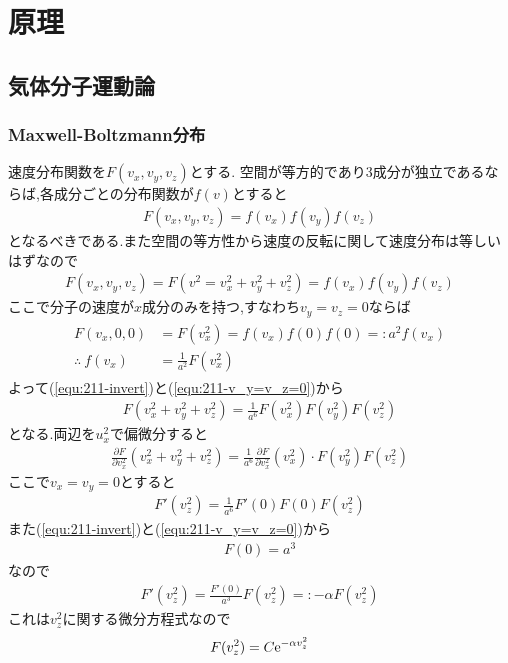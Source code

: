 \section{原理}
\subsection{気体分子運動論}
\subsubsection{Maxwell-Boltzmann分布}
速度分布関数を$F(v_x,v_y,v_z)$とする.
空間が等方的であり3成分が独立であるならば,各成分ごとの分布関数が$f(v)$とすると
\begin{align}
  F(v_x,v_y,v_z)=f(v_x)f(v_y)f(v_z)
\end{align}
となるべきである.また空間の等方性から速度の反転に関して速度分布は等しいはずなので
\begin{align}
  \label{equ:211-invert}
  F(v_x,v_y,v_z)=F(v^2=v_x^2+v_y^2+v_z^2)=f(v_x)f(v_y)f(v_z)
\end{align}
ここで分子の速度が$x$成分のみを持つ,すなわち$v_y=v_z=0$ならば
\begin{align}
  \label{equ:211-v_y=v_z=0}
  \begin{split}
    F(v_x,0,0)&=F(v_x^2)=f(v_x)f(0)f(0)=:a^2f(v_x)\\
    \therefore\ f(v_x)&=\frac{1}{a^2}F(v_x^2)
  \end{split}
\end{align}
よって(\ref{equ:211-invert})と(\ref{equ:211-v_y=v_z=0})から
\begin{align}
  F(v_x^2+v_y^2+v_z^2)=\frac{1}{a^6}F(v_x^2)F(v_y^2)F(v_z^2)
\end{align}
となる.両辺を$u_x^2$で偏微分すると
\begin{align}
  \frac{\partial F}{\partial v_x^2}(v_x^2+v_y^2+v_z^2)=\frac{1}{a^6}\frac{\partial F}{\partial v_x^2}(v_x^2)\cdot F(v_y^2)F(v_z^2)
\end{align}
ここで$v_x=v_y=0$とすると
\begin{align}
  F'(v_z^2)=\frac{1}{a^6}F'(0)F(0)F(v_z^2)
\end{align}
また(\ref{equ:211-invert})と(\ref{equ:211-v_y=v_z=0})から
\begin{align}
  F(0)=a^3
\end{align}
なので
\begin{align}
  F'(v_z^2)=\frac{F'(0)}{a^3}F(v_z^2)=:-\alpha F(v_z^2)
\end{align}
これは$v_z^2$に関する微分方程式なので
\begin{align}
  F(v_z^2)=C{\rm e}^{-\alpha v_z^2}
\end{align}
